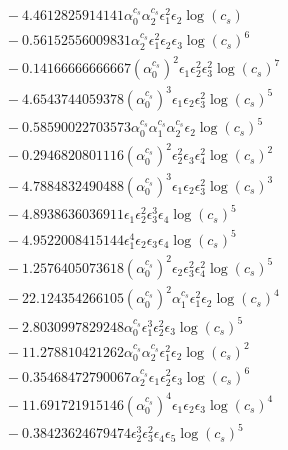 \documentclass[10pt]{article}
\begin{document}
\begin{align*}
&{}  - 4.4612825914141 \alpha_{0}^{c_s} \alpha_{2}^{c_s} \epsilon_{1}^{2} \epsilon_{2} \log{\left(c_{s} \right)} \\
&{}  - 0.56152556009831 \alpha_{2}^{c_s} \epsilon_{1}^{2} \epsilon_{2} \epsilon_{3} \log{\left(c_{s} \right)}^{6} \\
&{}  - 0.14166666666667 \left(\alpha_{0}^{c_s}\right)^{2} \epsilon_{1} \epsilon_{2}^{2} \epsilon_{3}^{2} \log{\left(c_{s} \right)}^{7} \\
&{}  - 4.6543744059378 \left(\alpha_{0}^{c_s}\right)^{3} \epsilon_{1} \epsilon_{2} \epsilon_{3}^{2} \log{\left(c_{s} \right)}^{5} \\
&{}  - 0.58590022703573 \alpha_{0}^{c_s} \alpha_{1}^{c_s} \alpha_{2}^{c_s} \epsilon_{2} \log{\left(c_{s} \right)}^{5} \\
&{}  - 0.2946820801116 \left(\alpha_{0}^{c_s}\right)^{2} \epsilon_{2}^{2} \epsilon_{3} \epsilon_{4}^{2} \log{\left(c_{s} \right)}^{2} \\
&{}  - 4.7884832490488 \left(\alpha_{0}^{c_s}\right)^{3} \epsilon_{1} \epsilon_{2} \epsilon_{3}^{2} \log{\left(c_{s} \right)}^{3} \\
&{}  - 4.8938636036911 \epsilon_{1} \epsilon_{2}^{2} \epsilon_{3}^{3} \epsilon_{4} \log{\left(c_{s} \right)}^{5} \\
&{}  - 4.9522008415144 \epsilon_{1}^{4} \epsilon_{2} \epsilon_{3} \epsilon_{4} \log{\left(c_{s} \right)}^{5} \\
&{}  - 1.2576405073618 \left(\alpha_{0}^{c_s}\right)^{2} \epsilon_{2} \epsilon_{3}^{2} \epsilon_{4}^{2} \log{\left(c_{s} \right)}^{5} \\
&{}  - 22.124354266105 \left(\alpha_{0}^{c_s}\right)^{2} \alpha_{1}^{c_s} \epsilon_{1}^{2} \epsilon_{2} \log{\left(c_{s} \right)}^{4} \\
&{}  - 2.8030997829248 \alpha_{0}^{c_s} \epsilon_{1}^{3} \epsilon_{2}^{2} \epsilon_{3} \log{\left(c_{s} \right)}^{5} \\
&{}  - 11.278810421262 \alpha_{0}^{c_s} \alpha_{2}^{c_s} \epsilon_{1}^{2} \epsilon_{2} \log{\left(c_{s} \right)}^{2} \\
&{}  - 0.35468472790067 \alpha_{2}^{c_s} \epsilon_{1} \epsilon_{2}^{2} \epsilon_{3} \log{\left(c_{s} \right)}^{6} \\
&{}  - 11.691721915146 \left(\alpha_{0}^{c_s}\right)^{4} \epsilon_{1} \epsilon_{2} \epsilon_{3} \log{\left(c_{s} \right)}^{4} \\
&{}  - 0.38423624679474 \epsilon_{2}^{3} \epsilon_{3}^{2} \epsilon_{4} \epsilon_{5} \log{\left(c_{s} \right)}^{5} \\

\end{align*}
\end{document}
